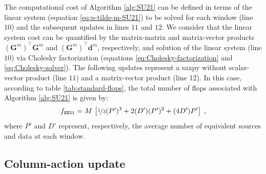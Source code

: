 \documentclass[utf8]{FrontiersinHarvard} %
\begin{document}
	The computational cost of Algorithm \ref{alg:SU21} can be defined in terms of the linear
	system (equation \ref{eq:p-tilde-m-SU21}) to be solved for each window (line $10$) and the 
	subsequent updates in lines $11$ and $12$.
	We consider that the linear system cost can be quantified by the matrix-matrix and 
	matrix-vector products $\left(\mathbf{G}^{m}\right)^{\top}\mathbf{G}^{m}$ and
	$\left(\mathbf{G}^{m}\right)^{\top}\mathbf{d}^{m}$, respectively, 
	and solution of the linear system (line $10$) via Cholesky factorization (equations 
	\ref{eq:Cholesky-factorization} and \ref{eq:Cholesky-solver}).
	The following updates represent a saxpy without scalar-vector product (line $11$) and a 
	matrix-vector product (line 12). In this case, according to table \ref{tab:standard-flops},
	the total number of flops associated with Algorithm \ref{alg:SU21} is given by:
	\begin{equation}
		f_{\mathtt{SU21}} = M \, 
		\left[ \nicefrac{1}{3}(P')^3 + 2(D')(P')^{2} + (4D')P' \right] \: ,
		\label{flops:SU21}
	\end{equation}
	where $P'$ and $D'$ represent, respectively, the average number of equivalent sources and 
	data at each window.
	
	\subsection{Column-action update}
	
	
\end{document}
